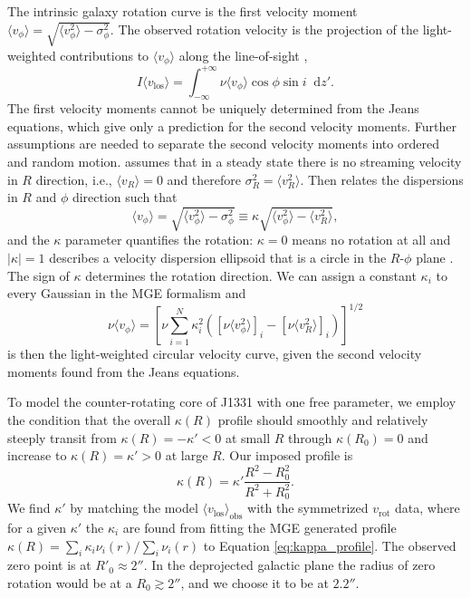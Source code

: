 \documentclass[useAMS,usenatbib]{mnras}
\newcommand*\diff{\mathop{}\!\mathrm{d}}
\begin{document}
The intrinsic galaxy rotation curve is the first velocity moment $\langle v_\phi\rangle = \sqrt{\langle v_\phi^2 \rangle - \sigma_\phi^2}$. The observed rotation velocity is the projection of the light-weighted contributions to $\langle v_\phi\rangle$ along the line-of-sight \citep{Cap08},
\begin{equation*}
I \langle v_\text{los}\rangle = \int_{-\infty}^{+\infty} \nu \langle v_\phi\rangle \cos \phi \sin i \diff z'.
\end{equation*}
The first velocity moments cannot be uniquely determined from the Jeans equations, which give only a prediction for the second velocity moments. Further assumptions are needed to separate the second velocity moments into ordered and random motion. \citet{Cap08} assumes that in a steady state there is no streaming velocity in $R$ direction, i.e., $\langle v_R \rangle = 0$ and therefore $\sigma_R^2 = \langle v_R^2 \rangle$. Then \citet{Cap08} relates the dispersions in $R$ and $\phi$ direction such that
$$\langle v_\phi\rangle = \sqrt{\langle v_\phi^2 \rangle - \sigma_\phi^2} \equiv \kappa \sqrt{\langle v_\phi^2 \rangle - \langle v_R^2 \rangle},$$
and the $\kappa$ parameter quantifies the rotation: $\kappa = 0$ means no rotation at all and $|\kappa| = 1$ describes a velocity dispersion ellipsoid that is a circle in the $R$-$\phi$ plane \citep{Cap08}. The sign of $\kappa$ determines the rotation direction. We can assign a constant $\kappa_i$ to every Gaussian in the MGE formalism and
\begin{equation*}
\nu \langle v_\phi\rangle = \left[\nu \sum_{i=1}^N \kappa_i^2 \left( [\nu\langle v_\phi^2 \rangle]_i - [\nu\langle v_R^2 \rangle]_i\right) \right]^{1/2}
\end{equation*} 
is then the light-weighted circular velocity curve, given the second velocity moments found from the Jeans equations.

To model the counter-rotating core of J1331 with one free parameter, we employ the condition that the overall $\kappa(R)$ profile should smoothly and relatively steeply transit from $\kappa(R) = -\kappa' < 0$ at small $R$ through $\kappa(R_0) = 0$ and increase to $\kappa(R) = \kappa' > 0$ at large $R$. Our imposed profile is
\begin{equation}
\kappa(R) = \kappa' \frac{R^2 - R_0^2}{R^2 + R_0^2}. \label{eq:kappa_profile}
\end{equation}
We find $\kappa'$ by matching the model $\langle v_\text{los} \rangle_\text{obs}$ with the symmetrized $v_\text{rot}$ data, where for a given $\kappa'$ the $\kappa_i$ are found from fitting the MGE generated profile $\kappa(R) = \sum_i \kappa_i \nu_i(r)/\sum_i \nu_i(r)$ to Equation \eqref{eq:kappa_profile}. The observed zero point is at $R'_0\approx 2''$. In the deprojected galactic plane the radius of zero rotation would be at a $R_0 \gtrsim 2''$, and we choose it to be at $2.2''$.
\end{document}
